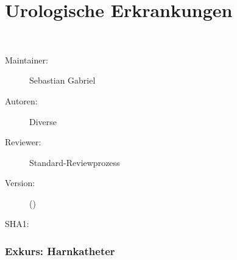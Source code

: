 

% 



\chapter
[\CO{[URO]} Urologische Erkrankungen]
{\CC{[URO]} Urologische Erkrankungen}
\ChapterIntro
{%
~~~
}
{%
\begin{description}
  \item[Maintainer:] Sebastian Gabriel
  \item[Autoren:] Diverse
  \item[Reviewer:] Standard-Reviewprozess
  \item[Version:] {\DocVersion} ({\DocVersionInfo})
  \item[SHA1:] {\DocGitCommit}
\end{description}

{\TxTeilkapitelAASS}
}


\subsection{Exkurs: Harnkatheter}

